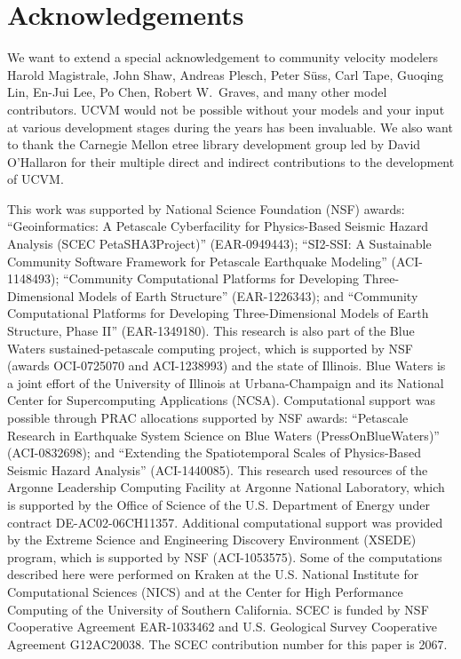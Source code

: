 
\section{Acknowledgements}

We want to extend a special acknowledgement to community velocity modelers Harold Magistrale, John Shaw, Andreas Plesch, Peter S\"{u}ss, Carl Tape, Guoqing Lin, En-Jui Lee, Po Chen, Robert W.~Graves, and many other model contributors. UCVM would not be possible without your models and your input at various development stages during the years has been invaluable. We also want to thank the Carnegie Mellon etree library development group led by David O'Hallaron for their multiple direct and indirect contributions to the development of UCVM.

This work was supported by National Science Foundation (NSF) awards: ``Geoinformatics: A Petascale Cyberfacility for Physics-Based Seismic Hazard Analysis (SCEC PetaSHA3Project)'' (EAR-0949443); ``SI2-SSI: A Sustainable Community Software Framework for Petascale Earthquake Modeling'' (ACI-1148493); ``Community Computational Platforms for Developing Three-Dimensional Models of Earth Structure'' (EAR-1226343); and ``Community Computational Platforms for Developing Three-Dimensional Models of Earth Structure, Phase II'' (EAR-1349180).  This research is also part of the Blue Waters sustained-petascale computing project, which is supported by NSF (awards OCI-0725070 and ACI-1238993) and the state of Illinois. Blue Waters is a joint effort of the University of Illinois at Urbana-Champaign and its National Center for Supercomputing Applications (NCSA). Computational support was possible through PRAC allocations supported by NSF awards: ``Petascale Research in Earthquake System Science on Blue Waters (PressOnBlueWaters)'' (ACI-0832698); and ``Extending the Spatiotemporal Scales of Physics-Based Seismic Hazard Analysis'' (ACI-1440085). This research used resources of the Argonne Leadership Computing Facility at Argonne National Laboratory, which is supported by the Office of Science of the U.S. Department of Energy under contract DE-AC02-06CH11357. Additional computational support was provided by the Extreme Science and Engineering Discovery Environment (XSEDE) program, which is supported by NSF (ACI-1053575). Some of the computations described here were performed on Kraken at the U.S. National Institute for Computational Sciences (NICS) and at the Center for High Performance Computing of the University of Southern California. SCEC is funded by NSF Cooperative Agreement EAR-1033462 and U.S. Geological Survey Cooperative Agreement G12AC20038. The SCEC contribution number for this paper is 2067.
